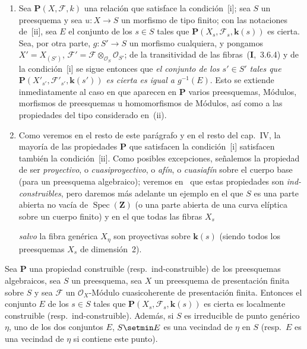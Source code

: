 \begin{remarks}[9.2.2]
\begin{enumerate}[label=(\roman*)]
  \item Sea $\boldsymbol{P}(X,\mathcal F,k)$ una relación que satisface la condición~[i]; sea $S$ un preesquema y sea $u:X\to S$ un morfismo de tipo finito; con las notaciones de~[ii], sea $E$ el conjunto de los $s\in S$ tales que $\boldsymbol{P}(X_s,\mathcal F_s,\boldsymbol{k}(s))$ es cierta.
Sea, por otra parte, $g:S'\to S$ un morfismo cualquiera, y pongamos $X'=X_{(S')}$, $\mathcal F'=\mathcal F\otimes_{\mathcal O_S}\mathcal O_{S'}$; de la transitividad de las fibras~(\textbf{I},~3.6.4) y de la condición~[i] se sigue entonces que \emph{el conjunto de los $s'\in S'$ tales que $\boldsymbol{P}(X'_{s'},\mathcal F'_{s'},\boldsymbol{k}(s'))$ es cierta es igual a $g^{-1}(E)$}.
Esto se extiende inmediatamente al caso en que aparecen en $\boldsymbol{P}$ varios preesquemas, Módulos, morfismos de preesquemas u homomorfismos de Módulos, así como a las propiedades del tipo considerado en~(ii).

  \item Como veremos en el resto de este parágrafo y en el resto del cap.~IV, la mayoría de las propiedades $\boldsymbol{P}$ que satisfacen la condición~[i] satisfacen también la condición~[ii].
Como posibles excepciones, señalemos la propiedad de ser \emph{proyectivo}, o \emph{cuasiproyectivo}, o \emph{afín}, o \emph{cuasiafín} sobre el cuerpo base (para un preesquema algebraico); veremos en~ que estas propiedades son \emph{ind-construibles}, pero daremos más adelante un ejemplo en el que $S$ es una parte abierta no vacía de $\operatorname{Spec}(\mathbf Z)$ (o una parte abierta de una curva elíptica sobre un cuerpo finito) y en el que todas las fibras $X_s$

\emph{salvo} la fibra genérica $X_\eta$ son proyectivas sobre $\boldsymbol{k}(s)$ (siendo todos los preesquemas $X_s$ de dimensión~2).
\end{enumerate}
\end{remarks}

\begin{proposition}[9.2.3]
\label{IV.9.2.3}
Sea $\boldsymbol{P}$ una propiedad construible \textnormal{(resp.}\ ind-construible\textnormal{)} de los preesquemas algebraicos, sea $S$ un preesquema, sea $X$ un preesquema de presentación finita sobre $S$ y sea $\mathcal F$ un $\mathcal O_X$-Módulo cuasicoherente de presentación finita.
Entonces el conjunto $E$ de los $s\in S$ tales que $\boldsymbol{P}(X_s,\mathcal F_s,\boldsymbol{k}(s))$ es cierta es localmente construible \textnormal{(resp.}\ ind-construible\textnormal{)}.
Además, si $S$ es irreducible de punto genérico $\eta$, uno de los dos conjuntos $E$, $S\setmin E$ es una vecindad de $\eta$ en $S$ \textnormal{(resp.}\ $E$ es una vecindad de $\eta$ si contiene este punto\textnormal{)}.
\end{proposition}

